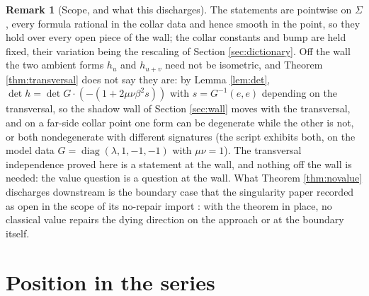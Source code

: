 \documentclass[11pt]{article}
\theoremstyle{definition}
\newtheorem{remark}[theorem]{Remark}
\newcommand{\Sig}{\Sigma}
\begin{document}
\begin{remark}[Scope, and what this discharges]\label{rem:transversalscope}
The statements are pointwise on $\Sig$, every formula rational in the collar data and hence smooth in the point, so they hold over every open piece of the wall; the collar constants and bump are held fixed, their variation being the rescaling of Section \ref{sec:dictionary}. Off the wall the two ambient forms $h_u$ and $h_{u+v}$ need not be isometric, and Theorem \ref{thm:transversal} does not say they are: by Lemma \ref{lem:det}, $\det h = \det G \cdot (-(1 + 2\mu\nu\beta^2 s))$ with $s = G^{-1}(e,e)$ depending on the transversal, so the shadow wall of Section \ref{sec:wall} moves with the transversal, and on a far-side collar point one form can be degenerate while the other is not, or both nondegenerate with different signatures (the script exhibits both, on the model data $G = \operatorname{diag}(\lambda, 1, -1, -1)$ with $\mu\nu = 1$). The transversal independence proved here is a statement at the wall, and nothing off the wall is needed: the value question is a question at the wall. What Theorem \ref{thm:novalue} discharges downstream is the boundary case that the singularity paper recorded as open in the scope of its no-repair import \cite{ButlerT5}: with the theorem in place, no classical value repairs the dying direction on the approach or at the boundary itself.
\end{remark}

\section{Position in the series}\label{sec:position}
\end{document}
